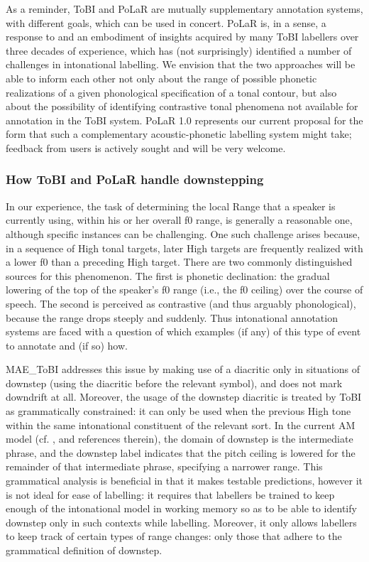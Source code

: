 As a reminder, ToBI and PoLaR are mutually supplementary annotation systems, with different goals, which can be used in concert.  PoLaR is, in a sense, a response to and an embodiment of insights acquired by many ToBI labellers over three decades of experience, which has (not surprisingly) identified a number of challenges in intonational labelling. We envision that the two approaches will be able to inform each other not only about the range of possible phonetic realizations of a given phonological specification of a tonal contour, but also about the possibility of identifying contrastive tonal phenomena not available for annotation in the ToBI system. PoLaR 1.0 represents our current proposal for the form that such a complementary acoustic-phonetic labelling system might take; feedback from users is actively sought and will be very welcome.

\subsubsection{How ToBI and PoLaR handle downstepping}\label{sec:downstepping-am-models-and-tobi-annotation}
In our experience, the task of determining the local Range that a speaker is currently using, within his or her overall f0 range, is generally a reasonable one, although specific instances can be challenging. One such challenge arises because, in a sequence of High tonal targets, later High targets are frequently realized with a lower f0 than a preceding High target. There are two commonly distinguished sources for this phenomenon. The first is phonetic declination: the gradual lowering of the top of the speaker’s f0 range (i.e., the f0 ceiling) over the course of speech. The second is perceived as contrastive (and thus arguably phonological), because the range drops steeply and suddenly. Thus intonational annotation systems are faced with a question of which examples (if any) of this type of event to annotate and (if so) how.

MAE\_ToBI addresses this issue by making use of a diacritic only in situations of downstep (using the \textlabel{!} diacritic before the relevant  symbol), and does not mark downdrift at all. Moreover, the usage of the downstep diacritic is treated by ToBI as grammatically constrained: it can only be used when the previous High tone within the same intonational constituent of the relevant sort. In the current AM model (cf. \citealt[17–18]{beckman-05}, and references therein), the domain of downstep is the intermediate phrase, and the downstep label indicates that the pitch ceiling is lowered for the remainder of that intermediate phrase, specifying a narrower range. This grammatical analysis is beneficial in that it makes testable predictions, however it is not ideal for ease of labelling: it requires that labellers be trained to keep enough of the intonational model in working memory so as to be able to identify downstep only in such contexts while labelling. Moreover, it only allows labellers to keep track of certain types of range changes: only those that adhere to the grammatical definition of downstep.

